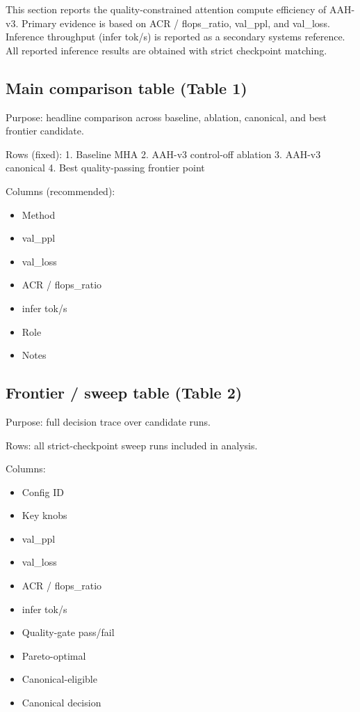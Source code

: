 \documentclass[11pt]{article}
\begin{document}
This section reports the quality-constrained attention compute efficiency of AAH-v3. Primary evidence is based on ACR / flops_ratio, val_ppl, and val_loss. Inference throughput (infer tok/s) is reported as a secondary systems reference. All reported inference results are obtained with strict checkpoint matching.

\subsection{Main comparison table (Table 1)}

Purpose: headline comparison across baseline, ablation, canonical, and best frontier candidate.

Rows (fixed):
	1.	Baseline MHA
	2.	AAH-v3 control-off ablation
	3.	AAH-v3 canonical
	4.	Best quality-passing frontier point

Columns (recommended):
\begin{itemize}
\item Method
\item val_ppl
\item val_loss
\item ACR / flops_ratio
\item infer tok/s
\item Role
\item Notes
\end{itemize}

\subsection{Frontier / sweep table (Table 2)}

Purpose: full decision trace over candidate runs.

Rows: all strict-checkpoint sweep runs included in analysis.

Columns:
\begin{itemize}
\item Config ID
\item Key knobs
\item val_ppl
\item val_loss
\item ACR / flops_ratio
\item infer tok/s
\item Quality-gate pass/fail
\item Pareto-optimal
\item Canonical-eligible
\item Canonical decision
\end{itemize}
\end{document}
